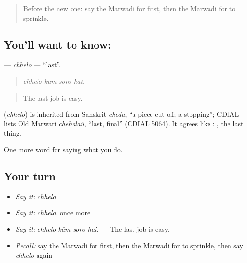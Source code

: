 \label{lesson:MW-C167-chhelo}



\begin{quote}
Before the new one: say the Marwadi for first, then the Marwadi for to sprinkle.
\end{quote}

\subsection*{You'll want to know: }
\textbf{} — \emph{chhelo} — \textquotedblleft{}last\textquotedblright{}.

\begin{quote}
   
\end{quote}

\begin{quote}
\emph{chhelo kām soro hai.}
\end{quote}

\begin{quote}
The last job is easy.
\end{quote}

\begin{cousinweb}
\textbf{} (\emph{chhelo}) is inherited from Sanskrit \emph{cheda}, \textquotedblleft{}a piece cut off; a stopping\textquotedblright{}; CDIAL lists Old Marwari \emph{chehalaü}, \textquotedblleft{}last, final\textquotedblright{} (CDIAL 5064). It agrees like \textbf{}: \textbf{ }, the last thing.
\end{cousinweb}

\begin{grammarlens}[title={What you've built}]
One more word for saying what you do.
\end{grammarlens}

\subsection*{Your turn}
\begin{itemize}
\raggedright
  \item \emph{Say it:} \emph{chhelo}
  \item \emph{Say it:} \emph{chhelo}, once more
  \item \emph{Say it:} \emph{chhelo kām soro hai.} — The last job is easy.
  \item \emph{Recall:} say the Marwadi for first, then the Marwadi for to sprinkle, then say \emph{chhelo} again
\end{itemize}

